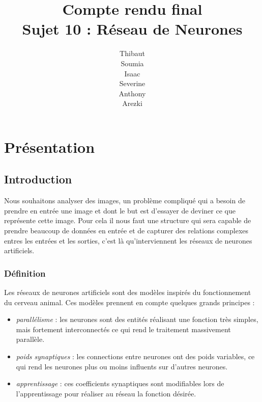\documentclass{article}
\begin{document}
\newpage
\title{Compte rendu final\\Sujet 10 : Réseau de Neurones}
\author{Thibaut \\Soumia {}\\Isaac {}\\Severine {}\\Anthony {}\\Arezki {}}
\maketitle

\newpage

\small{\tableofcontents}
\newpage

\section{Présentation}
	\subsection{Introduction}
			Nous souhaitons analyser des images, un problème compliqué qui a besoin de prendre en entrée une image et dont le but est d'essayer de deviner ce que représente cette image. Pour cela il nous faut une structure qui sera capable de prendre beaucoup de données en entrée et de capturer des relations complexes entres les entrées et les sorties, c'est là qu'interviennent les réseaux de neurones artificiels.
		\subsubsection{Définition}
			Les réseaux de neurones artificiels sont des modèles inspirés du fonctionnement du cerveau animal. Ces modèles prennent en compte quelques grands principes :
			\begin{itemize}
				\item \emph{parallélisme} : les neurones sont des entités réalisant une fonction très simples, mais fortement interconnectés ce qui rend le traitement massivement parallèle.
				\item \emph{poids synaptiques} : les connections entre neurones ont des poids variables, ce qui rend les neurones plus ou moins influents sur d'autres neurones.
				\item \emph{apprentissage} : ces coefficients synaptiques sont modifiables lors de l'apprentissage pour réaliser au réseau la fonction désirée.
			\end{itemize}
\end{document}
